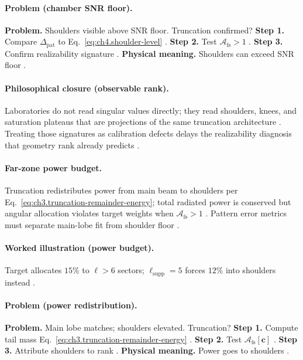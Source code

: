 \paragraph{Problem (chamber SNR floor).}
\textbf{Problem.} Shoulders visible above SNR floor. Truncation confirmed?
\textbf{Step 1.} Compare \(\Delta_{\mathrm{pat}}\) to Eq.~\eqref{eq:ch4.shoulder-level} \cite{hansen1988,harrington2001}.
\textbf{Step 2.} Test \(\mathcal{A}_{\mathrm{fs}}>1\) \cite{stratton1941,devaney2004}.
\textbf{Step 3.} Confirm realizability signature \cite{jackson1999,collin2001}.
\textbf{Physical meaning.} Shoulders can exceed SNR floor \cite{harrington2001}.

\paragraph{Philosophical closure (observable rank).}
Laboratories do not read singular values directly; they read shoulders, knees, and saturation plateaus that are projections of the same truncation
architecture \cite{stratton1941,harrington2001,hansen1988,jackson1999,devaney2004}. Treating those signatures as calibration defects delays the
realizability diagnosis that geometry rank already predicts \cite{collin2001,stratton1941}.

\paragraph{Far-zone power budget.}
Truncation redistributes power from main beam to shoulders per Eq.~\eqref{eq:ch3.truncation-remainder-energy}; total radiated power is conserved but
angular allocation violates target weights when \(\mathcal{A}_{\mathrm{fs}}>1\) \cite{hansen1988,stratton1941,harrington2001,devaney2004,jackson1999,collin2001}.
Pattern error metrics must separate main-lobe fit from shoulder floor \cite{harrington2001,stratton1941}.

\paragraph{Worked illustration (power budget).}
Target allocates \(15\%\) to \(\ell>6\) sectors; \(\ell_{\mathrm{supp}}=5\) forces \(12\%\) into shoulders instead \cite{hansen1988,harrington2001,stratton1941,devaney2004,jackson1999}.

\paragraph{Problem (power redistribution).}
\textbf{Problem.} Main lobe matches; shoulders elevated. Truncation?
\textbf{Step 1.} Compute tail mass Eq.~\eqref{eq:ch3.truncation-remainder-energy} \cite{hansen1988,stratton1941}.
\textbf{Step 2.} Test \(\mathcal{A}_{\mathrm{fs}}[\mathbf{c}]\) \cite{harrington2001,devaney2004}.
\textbf{Step 3.} Attribute shoulders to rank \cite{jackson1999,collin2001}.
\textbf{Physical meaning.} Power goes to shoulders \cite{stratton1941,harrington2001}.

